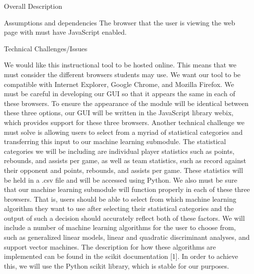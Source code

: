 \documentclass[letterpaper, 10pt,titlepage]{article}
\begin{document}
\begin{section}{Overall Description}
\begin{subsection}{Assumptions and dependencies}
The browser that the user is viewing the web page with must have JavaScript enabled.
\end{subsection}

\begin{subsection}{Technical Challenges/Issues}


We would like this instructional tool to be hosted online. This means that we must consider the different browsers students may use. We want our tool to be compatible with Internet Explorer, Google Chrome, and Mozilla Firefox. We must be careful in developing our GUI so that it appears the same in each of these browsers. To ensure the appearance of the module will be identical between these three options, our GUI will be written in the JavaScript library webix, which provides support for these three browsers. Another technical challenge we must solve is allowing users to select from a myriad of statistical categories and transferring this input to our machine learning submodule. The statistical categories we will be including are individual player statistics such as points, rebounds, and assists per game, as well as team statistics, such as record against their opponent and points, rebounds, and assists per game. These statistics will be held in a .csv file and will be accessed using Python. We also must be sure that our machine learning submodule will function properly in each of these three browsers. That is, users should be able to select from which machine learning algorithm they want to use after selecting their statistical categories and the output of such a decision should accurately reflect both of these factors. We will include a number of machine learning algorithms for the user to choose from, such as generalized linear models, linear and quadratic discriminant analyses, and support vector machines. The description for how these algorithms are implemented can be found in the scikit documentation [1]. In order to achieve this, we will use the Python scikit library, which is stable for our purposes.  

\end{subsection}
\end{section}
\end{document}
